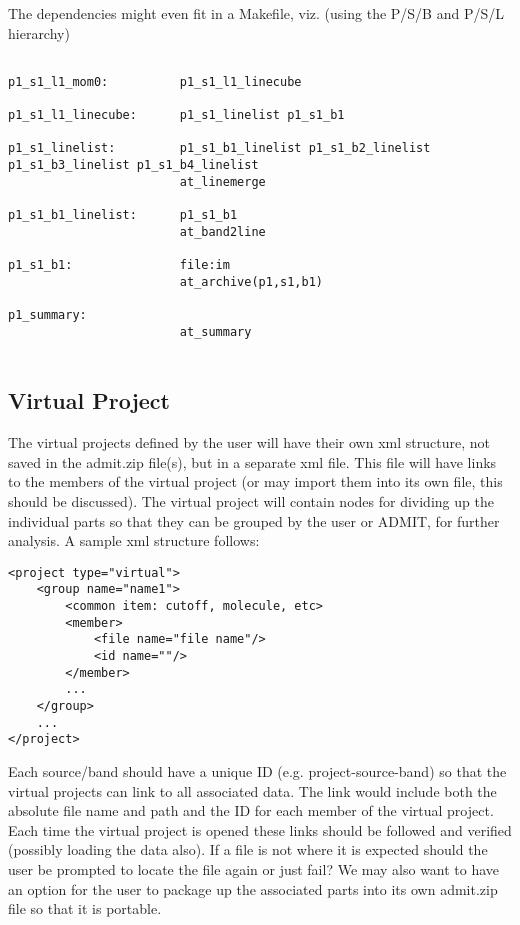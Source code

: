 \documentclass{article}
\begin{document}
\newpage

The dependencies might even fit in a Makefile, viz. (using the P/S/B and P/S/L hierarchy)


\footnotesize
\begin{verbatim}

p1_s1_l1_mom0:          p1_s1_l1_linecube

p1_s1_l1_linecube:      p1_s1_linelist p1_s1_b1

p1_s1_linelist:         p1_s1_b1_linelist p1_s1_b2_linelist p1_s1_b3_linelist p1_s1_b4_linelist
                        at_linemerge

p1_s1_b1_linelist:      p1_s1_b1
                        at_band2line

p1_s1_b1:               file:im
                        at_archive(p1,s1,b1)

p1_summary:
                        at_summary
        
\end{verbatim}
\normalsize

\subsection{Virtual Project}

The virtual projects defined by the user will have their own xml
structure, not saved in the admit.zip file(s), but in a separate xml
file. This file will have links to the members of the virtual project
(or may import them into its own file, this should be discussed). The
virtual project will contain nodes for dividing up the individual
parts so that they can be grouped by the user or ADMIT, for further
analysis. A sample xml structure follows:


\begin{verbatim}
<project type="virtual">
    <group name="name1">
    	<common item: cutoff, molecule, etc>
    	<member>
    		<file name="file name"/>
    		<id name=""/>
    	</member>
    	...
    </group>
    ...
</project>
\end{verbatim}

Each source/band should have a unique ID (e.g. project-source-band) so that the virtual projects can link to all associated data. The link would include both the absolute file name and path and the ID for each member of the virtual project. Each time the virtual project is opened these links should be followed and verified (possibly loading the data also). If a file is not where it is expected should the user be prompted to locate the file again or just fail? We may also want to have an option for the user to package up the associated parts into its own admit.zip file so that it is portable.
\end{document}

